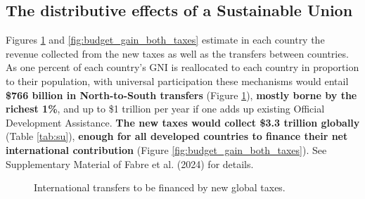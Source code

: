 \documentclass[12pt,english]{article}
\begin{document}
\subsection{The distributive effects of a Sustainable Union\label{subsec:distributive}}

Figures \ref{fig:gain_both_taxes} and \ref{fig:budget_gain_both_taxes} estimate in each country the revenue collected from the new taxes as well as the transfers between countries. %
As one percent of each country's GNI is reallocated to each country in proportion to their population, with universal participation these mechanisms would entail \textbf{\$766 billion in North-to-South transfers} (Figure \ref{fig:gain_both_taxes}), \textbf{mostly borne by the richest 1\%}, and up to \$1 trillion per year if one adds up existing Official Development Assistance. \textbf{The new taxes would collect \$3.3 trillion globally} (Table \ref{tab:su}), \textbf{enough for all developed countries to finance their net international contribution} (Figure \ref{fig:budget_gain_both_taxes}). See Supplementary Material of Fabre et al. (2024)\cite{fabre_shared_2024} for details. %

\begin{figure}[h!] 
  \caption{International transfers to be financed by new global taxes.}\label{fig:gain_both_taxes}
\end{figure}
\end{document}
